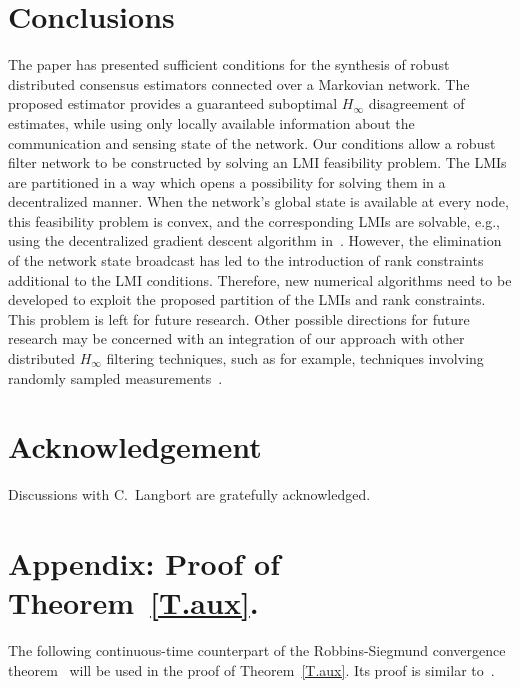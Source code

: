 \documentclass[a4paper,twocolumn]{autart}
\begin{document}
\section{Conclusions}\label{Conclusions}
The paper has presented sufficient conditions for the synthesis of robust
distributed consensus estimators connected over a Markovian network.
The proposed estimator provides a guaranteed suboptimal $H_\infty$
disagreement of estimates, while using only locally available information
about the communication and sensing state of the network. Our conditions allow a
robust filter network to be constructed by solving an LMI feasibility
problem. The LMIs are partitioned in a way which opens a possibility for
solving them in a decentralized manner. When the 
network's global state is available at every node, this feasibility problem is
convex, and the corresponding LMIs are solvable, e.g., using the decentralized
gradient descent algorithm in~\cite{U6}. However, the elimination
of the network state broadcast has led to the
introduction of rank constraints additional to the LMI
conditions. Therefore, new numerical algorithms need to be developed to
exploit the proposed partition of the LMIs and rank constraints. This
problem is left for future research.   
Other possible directions for future research may be concerned with 
an integration of our approach with other
distributed $H_\infty$ filtering techniques, such as for example,
techniques involving randomly sampled measurements~\cite{SWL-2011}. 

\section*{Acknowledgement}
Discussions with C.~Langbort are gratefully acknowledged. 

\section{Appendix: Proof of Theorem~\ref{T.aux}.}

The following continuous-time counterpart of the
Robbins-Siegmund convergence theorem~\cite{RS-1971} will be used in the proof of
Theorem~\ref{T.aux}. Its proof is similar to~\cite{RS-1971}.  
\end{document}

